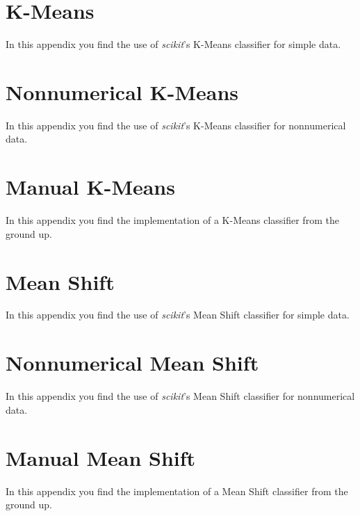 \chapter{K-Means}\label{code:kmeans}
In this appendix you find the use of \emph{scikit}'s K-Means classifier for simple data.


\chapter{Nonnumerical K-Means}\label{code:nonnumerical-kmeans}
In this appendix you find the use of \emph{scikit}'s K-Means classifier for nonnumerical data.


\chapter{Manual K-Means}\label{code:manual-kmeans}
In this appendix you find the implementation of a K-Means classifier from the ground up.


\chapter{Mean Shift}\label{code:meanshift}
In this appendix you find the use of \emph{scikit}'s Mean Shift classifier for simple data.


\chapter{Nonnumerical Mean Shift}\label{code:nonnumerical-meanshift}
In this appendix you find the use of \emph{scikit}'s Mean Shift classifier for nonnumerical data.


\chapter{Manual Mean Shift}\label{code:manual-meanshift}
In this appendix you find the implementation of a Mean Shift classifier from the ground up.


